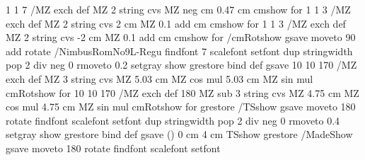 {{      1 1 7 { /MZ exch def MZ 2 string cvs MZ neg cm 0.47 cm cmshow } for %
      1 1 3 { /MZ exch def MZ 2 string cvs 2 cm MZ 0.1 add cm cmshow } for %
      1 1 3 { /MZ exch def MZ 2 string cvs -2 cm MZ 0.1 add cm cmshow } for %
  /cmRotshow {%
                             gsave
                                    moveto 90 add rotate  %
                                    /NimbusRomNo9L-Regu findfont 7 scalefont setfont
                                    dup %
                                    stringwidth pop 2 div neg 0 %
                                    rmoveto 0.2 setgray show
                             grestore
                          } bind def
  gsave
      10 10 170 { /MZ exch def MZ 3 string cvs  MZ 5.03 cm MZ cos mul 5.03 cm MZ sin mul  cmRotshow } for %
      10 10 170 { /MZ exch def 180 MZ sub 3 string cvs  MZ 4.75 cm MZ cos mul 4.75 cm MZ sin mul  cmRotshow } for %
 grestore
 /TSshow {%
                         gsave
                         moveto 180 rotate  %
                         \pst@PSfontO\space findfont \pst@fontsizeO scalefont setfont
                         dup %
                         stringwidth pop 2 div neg 0 %
                         rmoveto 0.4 setgray show
                         grestore
                      } bind def
   gsave
      (\pst@OwnerTxt) 0 cm 4 cm TSshow
   grestore
 /MadeShow {%
                         gsave
                         moveto 180 rotate  %
                         \pst@PSfontM\space findfont \pst@fontsizeM scalefont setfont
}}}
